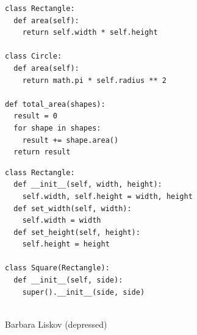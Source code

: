 \documentclass[calcdimensions,landscape,letterpaper]{powersem}
\newcommand{\thecurrentheading}{}
\newcommand{\heading}[1]{\renewcommand{\thecurrentheading}{#1}}
\begin{document}
\begin{slide}
  \heading{Open-Closed - After}
  \begin{center}
    \begin{verbatim}
class Rectangle:
  def area(self):
    return self.width * self.height

class Circle:
  def area(self):
    return math.pi * self.radius ** 2

def total_area(shapes):
  result = 0
  for shape in shapes:
    result += shape.area()
  return result
    \end{verbatim}
  \end{center}
\end{slide}

\begin{slide}
  \heading{Liskov-Substitution - Before}
  \begin{center}
    \begin{minipage}[b]{.6\textwidth}
      \begin{verbatim}
class Rectangle:
  def __init__(self, width, height):
    self.width, self.height = width, height
  def set_width(self, width):
    self.width = width
  def set_height(self, height):
    self.height = height

class Square(Rectangle):
  def __init__(self, side):
    super().__init__(side, side)
      \end{verbatim}
    \end{minipage}
    \begin{minipage}[b]{.35\textwidth}
        \\
        Barbara Liskov (depressed)
    \end{minipage}
  \end{center}
\end{slide}
\end{document}
